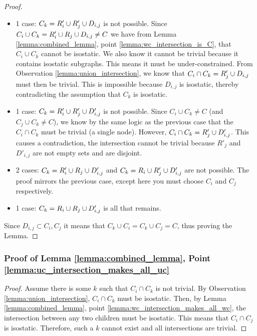 \begin{proof}
\begin{itemize}
    \item 1 case: $C_k=R'_i\cup R'_j\cup D_{i,j}$ is not possible. Since $C_i\cup C_k = R'_i\cup R_j\cup D_{i,j}\neq C$ we have from Lemma \ref{lemma:combined_lemma}, point \ref{lemma:wc_intersection_is_C}, that $C_i\cup C_k$ cannot be isostatic. We also know it cannot be trivial because it contains isostatic subgraphs. This means it must be under-constrained. From Observation \ref{lemma:union_intersection}, we know that $C_i\cap C_k=R'_j\cup D_{i,j}$ must then be trivial. This is impossible because $D_{i,j}$ is isostatic, thereby contradicting the assumption that $C_k$ is isostatic.

    \item 1 case: \usestwod $C_k=R'_i\cup R'_j\cup D'_{i,j}$ is not possible. Since $C_i\cup C_k\neq C$ (and $C_j\cup C_k\neq C$), we know by the same logic as the previous case that the $C_i\cap C_k$ must be trivial (a single node). However, $C_i\cap C_k=R'_j\cup D'_{i,j}$. This causes a contradiction, the intersection cannot be trivial because $R'_j$ and $D'_{i,j}$ are not empty sets and are disjoint.

    \item 2 cases: \usestwod $C_k=R'_i\cup R_j\cup D'_{i,j}$ and $C_k=R_i\cup R'_j\cup D'_{i,j}$ are not possible. The proof mirrors the previous case, except here you must choose $C_i$ and $C_j$ respectively.

    \item 1 case: $C_k=R_i\cup R_j\cup D'_{i,j}$ is all that remains.
\end{itemize}

Since $D_{i,j}\subset C_i, C_j$ it means that $C_k\cup C_i = C_k \cup C_j = C$, thus proving the Lemma.
%
\end{proof}

\subsubsection{Proof of Lemma \ref{lemma:combined_lemma}, Point \ref{lemma:uc_intersection_makes_all_uc}}

\begin{proof}
Assume there is some $k$ such that $C_i\cap C_k$ is not trivial. By Observation \ref{lemma:union_intersection}, $C_i\cap C_k$ must be isostatic. Then, by Lemma \ref{lemma:combined_lemma}, point \ref{lemma:wc_intersection_makes_all_wc}, the intersection between any two children must be isostatic. This means that $C_i\cap C_j$ is isostatic. Therefore, such a $k$ cannot exist and all intersections are trivial.
\end{proof}


